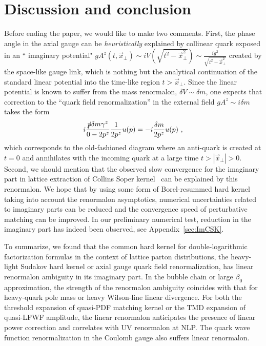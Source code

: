 \documentclass[a4paper,11pt]{article}
\begin{document}
\section{Discussion and conclusion}\label{sec:conclu}
Before ending the paper, we would like to make two comments. First,  the phase angle in the axial gauge can be {\it heuristically} explained by collinear quark exposed in an `` imaginary potential" $gA^z(t,\vec{x}_\perp)\sim i V(\sqrt{t^2-\vec{x}^2_\perp}) \sim \frac{ig^2}{\sqrt{t^2-\vec{x}_\perp^2}}$ created by the space-like gauge link, which is nothing but the analytical continuation of the standard linear potential into the time-like region $t>\vec{x}_\perp$. Since the linear potential is known to suffer from the mass renormalon, $\delta V \sim \delta m$, one expects that correction to the ``quark field renormalization'' in the external field $gA^z \sim i\delta m$ takes the form 
\begin{align}
i\frac{\slashed{p}\delta m \gamma^z}{0-2p^z}\frac{1}{2p^z}u(p)=-i\frac{\delta m}{2p^z} u(p)\ ,
\end{align}
which corresponds to the old-fashioned diagram where an anti-quark is created at $t=0$ and annihilates with the incoming quark at a large time $t>|\vec{x}_\perp|>0$.  Second, we should mention that the observed slow convergence for the imaginary part in lattice extraction of Collins Soper kernel~\cite{LatticePartonLPC:2023pdv,Avkhadiev:2023poz} can be explained by this renormalon. We hope that by using some form of Borel-resummed hard kernel taking into account the renormalon asymptotics, numerical uncertainties related to imaginary parts can be reduced and the convergence speed of perturbative matching can be improved. In our preliminary numerical test, reduction in the imaginary part has indeed been observed, see Appendix~\ref{sec:ImCSK}. 





To summarize, we found that the common hard kernel for double-logarithmic factorization formulas in the context of lattice parton distributions, the heavy-light Sudakov hard kernel or axial gauge quark field renormalization, has linear renormalon ambiguity in its imaginary part. In the bubble chain or large $\beta_0$ approximation, the strength of the renormalon ambiguity coincides with that for heavy-quark pole mass or heavy Wilson-line linear divergence. For both the threshold expansion of quasi-PDF matching kernel or the TMD expansion of quasi-LFWF amplitude, the linear renormalon anticipates the presence of linear power correction and correlates with UV renormalon at NLP.  The quark wave function renormalization in the Coulomb gauge also suffers linear renormalon.
\end{document}
